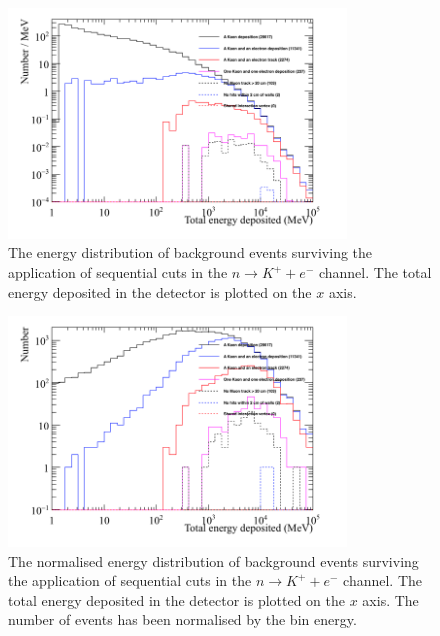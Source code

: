 \begin{figure}[h!]
  \centering
  \includegraphics[width=0.8\textwidth]{CosmicBackground_EnergyDepCuts_Raw}
  \caption[The energy distribution of background events surviving the application of sequential cuts in the $n \rightarrow K^{+} + e^{-}$ channel]
          {The energy distribution of background events surviving the application of sequential cuts in the $n \rightarrow K^{+} + e^{-}$ channel. The total energy deposited in the detector is plotted on the $x$ axis.}
  \label{fig:NDK_CosmoBack_Raw}
\end{figure}

\begin{figure}[h!]
  \centering
  \includegraphics[width=0.8\textwidth]{CosmicBackground_EnergyDepCuts_Norm}
  \caption[The normalised energy distribution of background events surviving the application of sequential cuts in the $n \rightarrow K^{+} + e^{-}$ channel]
          {The normalised energy distribution of background events surviving the application of sequential cuts in the $n \rightarrow K^{+} + e^{-}$ channel. The total energy deposited in the detector is plotted on the $x$ axis. The number of events has been normalised by the bin energy.}
  \label{fig:NDK_CosmoBack_Norm}
\end{figure}

